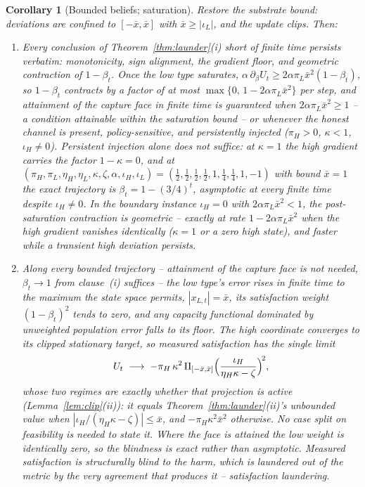 \documentclass[11pt]{article}
\newtheorem{corollary}[theorem]{Corollary}
\theoremstyle{definition}
\theoremstyle{remark}
\numberwithin{equation}{section}
\begin{document}
\begin{corollary}[Bounded beliefs; saturation]\label{cor:sat}
Restore the substrate bound: deviations are confined to $[-\bar x, \bar x]$ with $\bar x \ge |\iota_L|$, and the update clips. Then:
\begin{enumerate}
\item[(i)] Every conclusion of Theorem~\ref{thm:launder}(i) short of finite time persists verbatim: monotonicity, sign alignment, the gradient floor, and geometric contraction of $1-\beta_t$. Once the low type saturates, $\alpha\,\partial_\beta U_t \ge 2\alpha\pi_L\bar x^2(1-\beta_t)$, so $1-\beta_t$ contracts by a factor of at most $\max\{0,\,1 - 2\alpha\pi_L\bar x^2\}$ per step, and attainment of the capture face in finite time is guaranteed when $2\alpha\pi_L\bar x^2 \ge 1$ -- a condition attainable within the saturation bound -- or whenever the honest channel is present, policy-sensitive, and persistently injected ($\pi_H > 0$, $\kappa < 1$, $\iota_H \neq 0$). Persistent injection alone does not suffice: at $\kappa = 1$ the high gradient carries the factor $1-\kappa = 0$, and at $(\pi_H,\pi_L,\eta_H,\eta_L,\kappa,\zeta,\alpha,\iota_H,\iota_L) = (\tfrac12,\tfrac12,\tfrac12,\tfrac12,1,\tfrac14,\tfrac14,1,-1)$ with bound $\bar x = 1$ the exact trajectory is $\beta_t = 1-(3/4)^t$, asymptotic at every finite time despite $\iota_H \neq 0$. In the boundary instance $\iota_H = 0$ with $2\alpha\pi_L\bar x^2 < 1$, the post-saturation contraction is geometric -- exactly at rate $1 - 2\alpha\pi_L\bar x^2$ when the high gradient vanishes identically ($\kappa = 1$ or a zero high state), and faster while a transient high deviation persists.
\item[(ii)] Along \emph{every} bounded trajectory -- attainment of the capture face is not needed, $\beta_t \to 1$ from clause~(i) suffices -- the low type's error rises in finite time to the maximum the state space permits, $|x_{L,t}| = \bar x$, its satisfaction weight $(1-\beta_t)^2$ tends to zero, and any capacity functional dominated by unweighted population error falls to its floor. The high coordinate converges to its \emph{clipped} stationary target, so measured satisfaction has the single limit
\[
U_t \;\longrightarrow\; -\pi_H\,\kappa^2\,\Pi_{[-\bar x,\bar x]}\Bigl(\frac{\iota_H}{\eta_H\kappa - \zeta}\Bigr)^{\!2},
\]
whose two regimes are exactly whether that projection is active (Lemma~\ref{lem:clip}(ii)): it equals Theorem~\ref{thm:launder}(ii)'s unbounded value when $|\iota_H/(\eta_H\kappa - \zeta)| \le \bar x$, and $-\pi_H\kappa^2\bar x^2$ otherwise. No case split on feasibility is needed to state it. Where the face \emph{is} attained the low weight is identically zero, so the blindness is exact rather than asymptotic. Measured satisfaction is structurally blind to the harm, which is laundered out of the metric by the very agreement that produces it -- \emph{satisfaction laundering}.
\end{enumerate}
\end{corollary}
\end{document}
